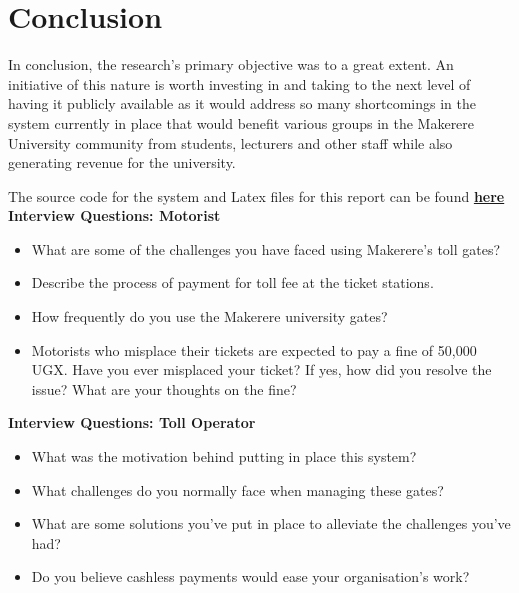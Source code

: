 \section{Conclusion}
In conclusion, the research's primary objective was to a great extent. An initiative of this nature is worth investing in and taking to the next level of having it publicly available as it would address so many shortcomings in the system currently in place that would benefit various groups in the Makerere University community from students, lecturers and other staff while also generating revenue for the university.


\clearpage


\begin{appendices}
    The source code for the system and Latex files for this report can be found \href{https://github.com/Mnoble-19/final-year-project}\textbf{{here}}
    \textbf{Interview Questions: Motorist}
    \begin{itemize}
        \item What are some of the challenges you have faced using Makerere's toll gates?
        \item Describe the process of payment for toll fee at the ticket stations.
        \item How frequently do you use the Makerere university gates?
        \item Motorists who misplace their tickets are expected to pay a fine of 50,000 UGX. Have you ever misplaced your ticket? If yes, how did you resolve the issue? What are your thoughts on the fine?
    \end{itemize}

    \textbf{Interview Questions: Toll Operator}
    \begin{itemize}
        \item What was the motivation behind putting in place this system?
        \item What challenges do you normally face when managing these gates?
        \item What are some solutions you've put in place to alleviate the challenges you've had?
        \item Do you believe cashless payments would ease your organisation's work?
    \end{itemize}



\end{appendices}
